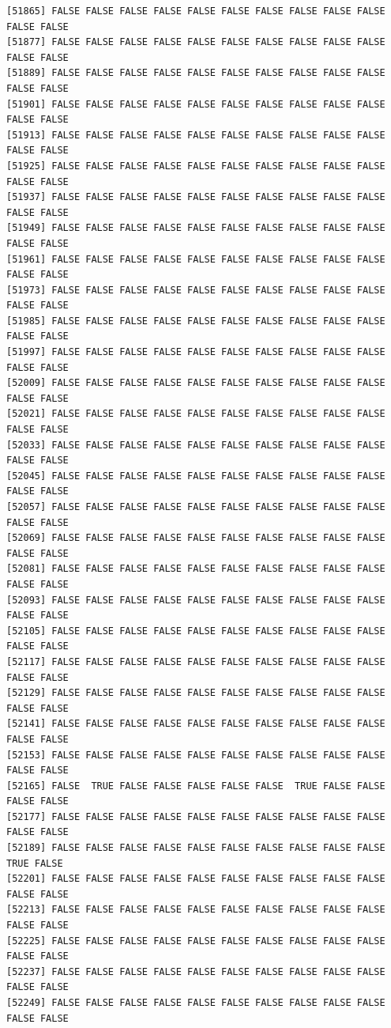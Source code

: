 \documentclass[
  a4paper,
  DIV=11,
  numbers=noendperiod]{scrartcl}
\begin{document}
\begin{verbatim}
[51865] FALSE FALSE FALSE FALSE FALSE FALSE FALSE FALSE FALSE FALSE FALSE FALSE
[51877] FALSE FALSE FALSE FALSE FALSE FALSE FALSE FALSE FALSE FALSE FALSE FALSE
[51889] FALSE FALSE FALSE FALSE FALSE FALSE FALSE FALSE FALSE FALSE FALSE FALSE
[51901] FALSE FALSE FALSE FALSE FALSE FALSE FALSE FALSE FALSE FALSE FALSE FALSE
[51913] FALSE FALSE FALSE FALSE FALSE FALSE FALSE FALSE FALSE FALSE FALSE FALSE
[51925] FALSE FALSE FALSE FALSE FALSE FALSE FALSE FALSE FALSE FALSE FALSE FALSE
[51937] FALSE FALSE FALSE FALSE FALSE FALSE FALSE FALSE FALSE FALSE FALSE FALSE
[51949] FALSE FALSE FALSE FALSE FALSE FALSE FALSE FALSE FALSE FALSE FALSE FALSE
[51961] FALSE FALSE FALSE FALSE FALSE FALSE FALSE FALSE FALSE FALSE FALSE FALSE
[51973] FALSE FALSE FALSE FALSE FALSE FALSE FALSE FALSE FALSE FALSE FALSE FALSE
[51985] FALSE FALSE FALSE FALSE FALSE FALSE FALSE FALSE FALSE FALSE FALSE FALSE
[51997] FALSE FALSE FALSE FALSE FALSE FALSE FALSE FALSE FALSE FALSE FALSE FALSE
[52009] FALSE FALSE FALSE FALSE FALSE FALSE FALSE FALSE FALSE FALSE FALSE FALSE
[52021] FALSE FALSE FALSE FALSE FALSE FALSE FALSE FALSE FALSE FALSE FALSE FALSE
[52033] FALSE FALSE FALSE FALSE FALSE FALSE FALSE FALSE FALSE FALSE FALSE FALSE
[52045] FALSE FALSE FALSE FALSE FALSE FALSE FALSE FALSE FALSE FALSE FALSE FALSE
[52057] FALSE FALSE FALSE FALSE FALSE FALSE FALSE FALSE FALSE FALSE FALSE FALSE
[52069] FALSE FALSE FALSE FALSE FALSE FALSE FALSE FALSE FALSE FALSE FALSE FALSE
[52081] FALSE FALSE FALSE FALSE FALSE FALSE FALSE FALSE FALSE FALSE FALSE FALSE
[52093] FALSE FALSE FALSE FALSE FALSE FALSE FALSE FALSE FALSE FALSE FALSE FALSE
[52105] FALSE FALSE FALSE FALSE FALSE FALSE FALSE FALSE FALSE FALSE FALSE FALSE
[52117] FALSE FALSE FALSE FALSE FALSE FALSE FALSE FALSE FALSE FALSE FALSE FALSE
[52129] FALSE FALSE FALSE FALSE FALSE FALSE FALSE FALSE FALSE FALSE FALSE FALSE
[52141] FALSE FALSE FALSE FALSE FALSE FALSE FALSE FALSE FALSE FALSE FALSE FALSE
[52153] FALSE FALSE FALSE FALSE FALSE FALSE FALSE FALSE FALSE FALSE FALSE FALSE
[52165] FALSE  TRUE FALSE FALSE FALSE FALSE FALSE  TRUE FALSE FALSE FALSE FALSE
[52177] FALSE FALSE FALSE FALSE FALSE FALSE FALSE FALSE FALSE FALSE FALSE FALSE
[52189] FALSE FALSE FALSE FALSE FALSE FALSE FALSE FALSE FALSE FALSE  TRUE FALSE
[52201] FALSE FALSE FALSE FALSE FALSE FALSE FALSE FALSE FALSE FALSE FALSE FALSE
[52213] FALSE FALSE FALSE FALSE FALSE FALSE FALSE FALSE FALSE FALSE FALSE FALSE
[52225] FALSE FALSE FALSE FALSE FALSE FALSE FALSE FALSE FALSE FALSE FALSE FALSE
[52237] FALSE FALSE FALSE FALSE FALSE FALSE FALSE FALSE FALSE FALSE FALSE FALSE
[52249] FALSE FALSE FALSE FALSE FALSE FALSE FALSE FALSE FALSE FALSE FALSE FALSE

\end{verbatim}
\end{document}
